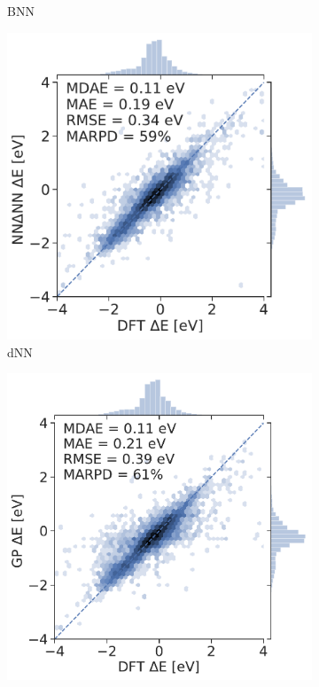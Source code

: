 \documentclass[]{achemso}
\begin{document}
\begin{figure}
\begin{subfigure}{0.32\textwidth}
        \caption{\gls{BNN}}\label{fig:parity_bnn}
    \end{subfigure}
    \begin{subfigure}{0.32\textwidth}
        \includegraphics[width=\textwidth]{../NNdNN/parity.pdf}
        \caption{\gls{dNN}}\label{fig:parity_dnn}
    \end{subfigure}
    \begin{subfigure}{0.32\textwidth}
        \includegraphics[width=\textwidth]{../GP/Matern/parity.pdf}

\end{subfigure}
\end{figure}
\end{document}
